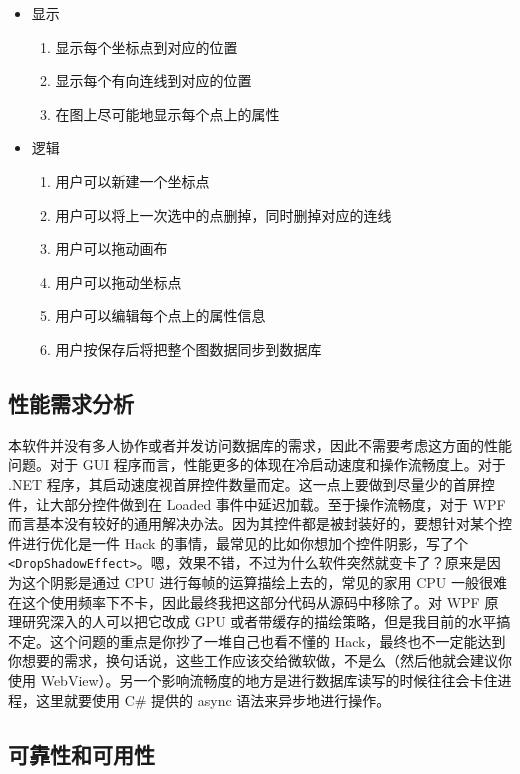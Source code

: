 \begin{itemize}
  \item 显示
  \begin{enumerate}
    \item 显示每个坐标点到对应的位置
    \item 显示每个有向连线到对应的位置
    \item 在图上尽可能地显示每个点上的属性
  \end{enumerate}
  \item 逻辑
  \begin{enumerate}
    \item 用户可以新建一个坐标点
    \item 用户可以将上一次选中的点删掉，同时删掉对应的连线
    \item 用户可以拖动画布
    \item 用户可以拖动坐标点
    \item 用户可以编辑每个点上的属性信息
    \item 用户按保存后将把整个图数据同步到数据库
  \end{enumerate}
\end{itemize}

\subsection{性能需求分析}

本软件并没有多人协作或者并发访问数据库的需求，因此不需要考虑这方面的性能问题。对于 GUI 程序而言，性能更多的体现在冷启动速度和操作流畅度上。对于 .NET 程序，其启动速度视首屏控件数量而定。这一点上要做到尽量少的首屏控件，让大部分控件做到在 Loaded 事件中延迟加载。至于操作流畅度，对于 WPF 而言基本没有较好的通用解决办法。因为其控件都是被封装好的，要想针对某个控件进行优化是一件 Hack 的事情，最常见的比如你想加个控件阴影，写了个 \texttt{<DropShadowEffect>}。嗯，效果不错，不过为什么软件突然就变卡了？原来是因为这个阴影是通过 CPU 进行每帧的运算描绘上去的，常见的家用 CPU 一般很难在这个使用频率下不卡，因此最终我把这部分代码从源码中移除了。对 WPF 原理研究深入的人可以把它改成 GPU 或者带缓存的描绘策略，但是我目前的水平搞不定。这个问题的重点是你抄了一堆自己也看不懂的 Hack，最终也不一定能达到你想要的需求，换句话说，这些工作应该交给微软做，不是么（然后他就会建议你使用 WebView）。另一个影响流畅度的地方是进行数据库读写的时候往往会卡住进程，这里就要使用 C\# 提供的 async 语法来异步地进行操作。

\subsection{可靠性和可用性}

